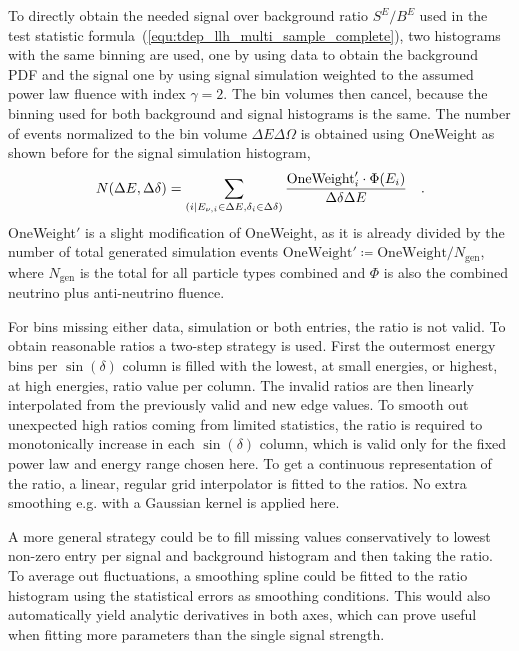 To directly obtain the needed signal over background ratio $S^E / B^E$ used in the test statistic formula~(\ref{equ:tdep_llh_multi_sample_complete}), two histograms with the same binning are used, one by using data to obtain the background PDF and the signal one by using signal simulation weighted to the assumed power law fluence with index $\gamma = 2$.
The bin volumes then cancel, because the binning used for both background and signal histograms is the same.
The number of events normalized to the bin volume $\Delta E\Delta\Omega$ is obtained using OneWeight as shown before for the signal simulation histogram,
\begin{equation}
  \label{equ:nevts_from_oneweight}
  N(\Delta E, \Delta\delta)
  = \sum_{(i|E_{\nu,i}\in\Delta E, \delta_i\in\Delta\delta)}
    \frac{\text{OneWeight}'_i \cdot \Phi(E_i)}{\Delta\delta \Delta E}
  \quad\text{.}
\end{equation}
OneWeight$'$ is a slight modification of OneWeight, as it is already divided by the number of total generated simulation events $\text{OneWeight}'\coloneqq\text{OneWeight}/N_\text{gen}$, where $N_\text{gen}$ is the total for all particle types combined and $\Phi$ is also the combined neutrino plus anti-neutrino fluence.

For bins missing either data, simulation or both entries, the ratio is not valid.
To obtain reasonable ratios a two-step strategy is used.
First the outermost energy bins per $\sin(\delta)$ column is filled with the lowest, at small energies, or highest, at high energies, ratio value per column.
The invalid ratios are then linearly interpolated from the previously valid and new edge values.
To smooth out unexpected high ratios coming from limited statistics, the ratio is required to monotonically increase in each $\sin(\delta)$ column, which is valid only for the fixed power law and energy range chosen here.
To get a continuous representation of the ratio, a linear, regular grid interpolator is fitted to the ratios.
No extra smoothing e.g. with a Gaussian kernel is applied here.

A more general strategy could be to fill missing values conservatively to lowest non-zero entry per signal and background histogram and then taking the ratio.
To average out fluctuations, a smoothing spline could be fitted to the ratio histogram using the statistical errors as smoothing conditions.
This would also automatically yield analytic derivatives in both axes, which can prove useful when fitting more parameters than the single signal strength.


